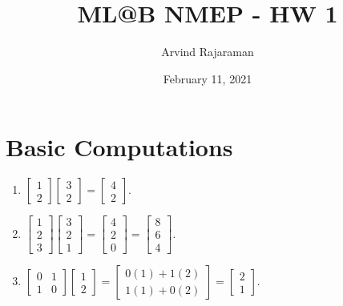 \documentclass{article}
\title{ML@B NMEP - HW 1}
\author{Arvind Rajaraman}
\date{February 11, 2021}
\begin{document}
\maketitle

\section{Basic Computations}
\begin{enumerate}
    \item $\begin{bmatrix}
        1 \\ 2
    \end{bmatrix} \begin{bmatrix}
        3 \\ 2
    \end{bmatrix} = \begin{bmatrix}
        4 \\ 2
    \end{bmatrix}.$
    \item $\begin{bmatrix}
        1 \\ 2 \\ 3
    \end{bmatrix} \begin{bmatrix}
        3 \\ 2 \\ 1
    \end{bmatrix} = \begin{bmatrix}
        4 \\ 2 \\ 0
    \end{bmatrix} = \begin{bmatrix}
        8 \\ 6 \\ 4
    \end{bmatrix}.$
    \item $\begin{bmatrix}
        0 & 1 \\
        1 & 0
    \end{bmatrix} \begin{bmatrix}
        1 \\ 2
    \end{bmatrix} = \begin{bmatrix}
        0(1) + 1(2) \\ 1(1) + 0(2)
    \end{bmatrix} = \begin{bmatrix}
        2 \\ 1
    \end{bmatrix}.$
\end{enumerate}
\end{document}

